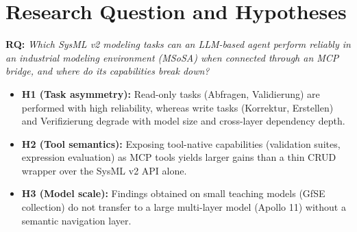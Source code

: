 \section*{Research Question and Hypotheses}
\textbf{RQ:} \textit{Which SysML v2 modeling tasks can an LLM-based agent perform reliably in an industrial modeling environment (MSoSA) when connected through an MCP bridge, and where do its capabilities break down?}

\begin{itemize}
    \item \textbf{H1 (Task asymmetry):} Read-only tasks (Abfragen, Validierung) are performed with high reliability, whereas write tasks (Korrektur, Erstellen) and Verifizierung degrade with model size and cross-layer dependency depth.
    \item \textbf{H2 (Tool semantics):} Exposing tool-native capabilities (validation suites, expression evaluation) as MCP tools yields larger gains than a thin CRUD wrapper over the SysML v2 API alone. %
    \item \textbf{H3 (Model scale):} Findings obtained on small teaching models (GfSE collection) do not transfer to a large multi-layer model (Apollo 11) without a semantic navigation layer.
\end{itemize}

